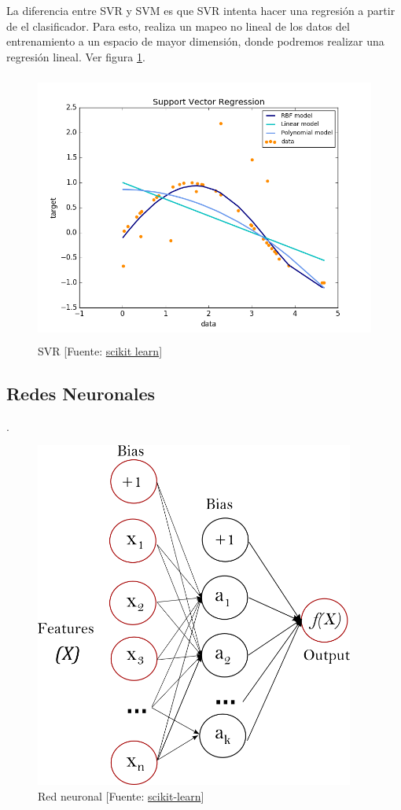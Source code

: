 	La diferencia entre SVR y SVM es que SVR intenta hacer una regresión a partir de el clasificador. Para esto, realiza un mapeo no lineal de los datos del entrenamiento a un espacio de mayor dimensión, donde podremos realizar una regresión lineal. Ver figura \ref{svr}.

	\begin{figure}[htb]
		\begin{center}
			\includegraphics[height=3.5in]{figures/svr.png}
			\caption{SVR [Fuente: \href{http://scikit-learn.org/stable/auto_examples/svm/plot_svm_regression.html}{scikit learn}] }
		\end{center}
		\label{svr}
	\end{figure}
	
	\subsection{Redes Neuronales}
	\label{makereference4.3.3}
	.
	\begin{figure}[htb]
		
		\begin{center}
			\includegraphics[height=4.5in]{figures/neuronal_network.png}
			\caption{Red neuronal [Fuente: \href{www.scikit-learn.org}{scikit-learn}]}
		\end{center}
		
		\label{network}
	\end{figure}

